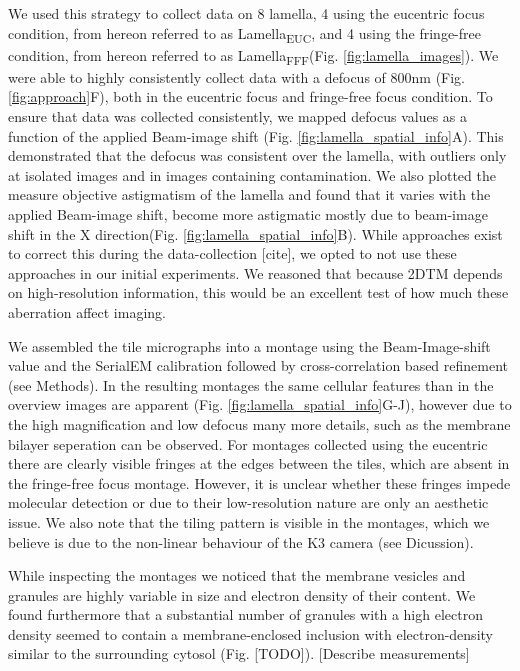 \documentclass[
]{article}
\begin{document}
We used this strategy to collect data on 8 lamella, 4 using the eucentric focus
condition, from hereon referred to as Lamella\textsubscript{EUC}, and 4 using the fringe-free
condition, from hereon referred to as Lamella\textsubscript{FFF}(Fig. \ref{fig:lamella_images}).
We were able to highly consistently collect data with a defocus of 800nm (Fig.
\ref{fig:approach}F), both in the eucentric focus and fringe-free focus condition.
To ensure that data was collected consistently, we mapped defocus values as a
function of the applied Beam-image shift (Fig. \ref{fig:lamella_spatial_info}A).
This demonstrated that the defocus was consistent over the lamella, with
outliers only at isolated images and in images containing contamination. We also
plotted the measure objective astigmatism of the lamella and found that it
varies with the applied Beam-image shift, become more astigmatic mostly due to
beam-image shift in the X direction(Fig. \ref{fig:lamella_spatial_info}B). While
approaches exist to correct this during the data-collection {[}cite{]}, we opted to not use
these approaches in our initial experiments. We reasoned that because 2DTM depends on high-resolution information, this would be an excellent test of how much these aberration affect imaging.

We assembled the tile micrographs into a montage using the Beam-Image-shift value and the SerialEM calibration followed by cross-correlation based refinement (see Methods). In the resulting montages the same cellular features than in the overview images are apparent (Fig. \ref{fig:lamella_spatial_info}G-J), however due to the high magnification and low defocus many more details, such as the membrane bilayer seperation can be observed. For montages collected using the eucentric there are clearly visible fringes at the edges between the tiles, which are absent in the fringe-free focus montage. However, it is unclear whether these fringes impede molecular detection or due to their low-resolution nature are only an aesthetic issue. We also note that the tiling pattern is visible in the montages, which we believe is due to the non-linear behaviour of the K3 camera (see Dicussion).

While inspecting the montages we noticed that the membrane vesicles and granules are highly variable in size and electron density of their content. We found furthermore that a substantial number of granules with a high electron density seemed to contain a membrane-enclosed inclusion with electron-density similar to the surrounding cytosol (Fig. {[}TODO{]}). {[}Describe measurements{]}
\end{document}

